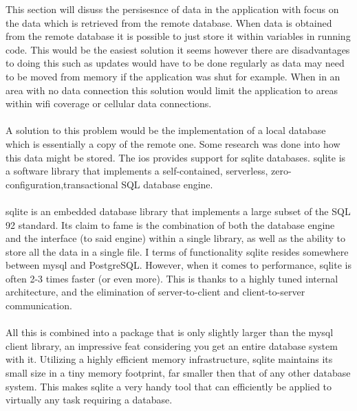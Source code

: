 \documentclass[12pt]{article}
\begin{document}
This section will disuss the persisesnce of data in the application with focus on the data which is retrieved from the remote database. When data is obtained from the remote database it is possible to just store it within variables in running code. This would be the easiest solution it seems however there are disadvantages to doing this such as updates would have to be done regularly as data may need to be moved from memory if the application was shut for example. When in an area with no data connection this solution would limit the application to areas within wifi coverage or cellular data connections. 

\paragraph{}


A solution to this problem would be the implementation of a local database which is essentially a copy of the remote one. Some research was done into how this data might be stored. The \gls{ios} provides support for sqlite databases. sqlite is a software library that implements a self-contained, serverless, zero-configuration,transactional SQL database engine. 

\paragraph{}

\gls{sqlite} is an embedded database library that implements a large subset of the SQL 92 standard. Its claim to fame is the combination of both the database engine and the interface (to said engine) within a single library, as well as the ability to store all the data in a single file. I terms of functionality \gls{sqlite} resides somewhere between \gls{mysql} and PostgreSQL. However, when it comes to performance, \gls{sqlite} is often 2-3 times faster (or even more). This is thanks to a highly tuned internal architecture, and the elimination of server-to-client and client-to-server communication. 

\paragraph{}

All this is combined into a package that is only slightly larger than the \gls{mysql} client library, an impressive feat considering you get an entire database system with it. Utilizing a highly efficient memory infrastructure, \gls{sqlite} maintains its small size in a tiny memory footprint, far smaller then that of any other database system. This makes \gls{sqlite} a very handy tool that can efficiently be applied to virtually any task requiring a database.
\end{document}
